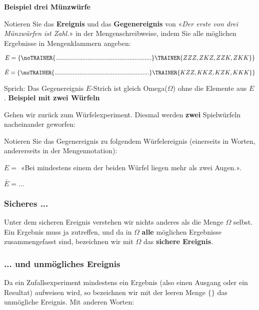 \textbf{Beispiel drei Münzwürfe}

Notieren Sie das \textbf{Ereignis} und das \textbf{Gegenereignis} von «\textit{Der erste von drei Münzwürfen
  ist Zahl.}» in der Mengenschreibweise, indem Sie alle
möglichen Ergebnisse in Mengenklammern angeben:

$$E = \{
\noTRAINER{.........................................................}\TRAINER{ZZZ,
ZKZ, ZZK, ZKK\}}$$

$$\bar{E} = \{
\noTRAINER{.........................................................}\TRAINER{KZZ,
KKZ, KZK, KKK\}}$$


Sprich: Das Gegenereignis $E$-Strich ist gleich Omega($\Omega$) ohne die Elemente
aus $E$.
\newpage
\textbf{Beispiel mit zwei Würfeln}


Gehen wir zurück zum Würfelexperiment. Diesmal werden
\textbf{zwei} Spielwürfeln nacheinander geworfen:

Notieren Sie das Gegenereignis zu folgendem
Würfelereignis (einerseits in Worten, andererseits in der Mengennotation):

$E=$ «Bei mindestens einem der beiden Würfel liegen
mehr als zwei Augen.».

$\bar{E} = ...$


\subsubsection{Sicheres ...}
Unter dem sicheren Ereignis verstehen wir nichts anderes als die Menge
$\Omega$ selbst. Ein Ergebnis muss ja zutreffen, und da in $\Omega$
\textbf{alle} möglichen Ergebnisse zusammengefasst sind, bezeichnen
wir mit $\Omega$ das \textbf{sichere Ereignis}.

\subsubsection{... und unmögliches Ereignis}
Da ein Zufallsexperiment mindestens ein Ergebnis (also einen Ausgang
oder ein Resultat) aufweisen wird, so bezeichnen wir mit der leeren
Menge $\{\}$ das unmögliche Ereignis. Mit anderen Worten:


